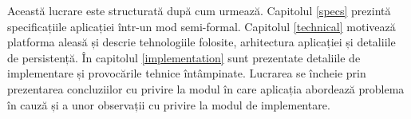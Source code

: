 
Această lucrare este structurată după cum urmează. Capitolul \ref{specs} prezintă specificațiile aplicației \AppName într-un mod semi-formal. Capitolul \ref{technical} motivează platforma aleasă și descrie tehnologiile folosite, arhitectura aplicației și detaliile de persistență. În capitolul \ref{implementation} sunt prezentate detaliile de implementare și provocările tehnice întâmpinate. Lucrarea se încheie prin prezentarea concluziilor cu privire la modul în care aplicația abordează problema în cauză și a unor observații cu privire la modul de implementare.
